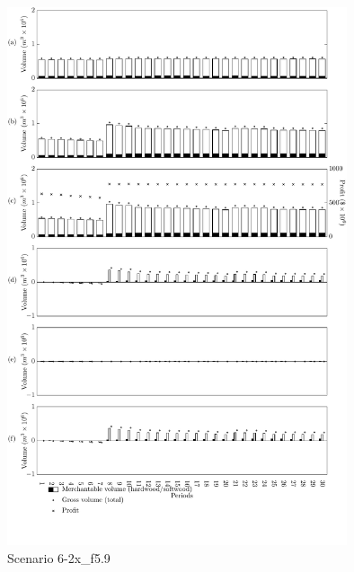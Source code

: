 \begin{figure}[h]
  \centering
  \includegraphics[width=10cm]{images/appendix/s6-2x_test80}
  \caption{Scenario 6-2x\_f5.9}
  \label{fig:s6-2x_test80}
\end{figure}

